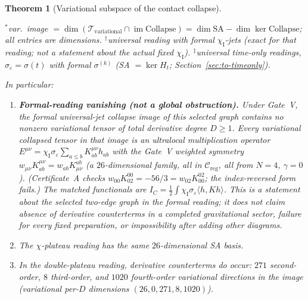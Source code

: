 \documentclass{article}
\newtheorem{theorem}[proposition]{Theorem}
\theoremstyle{remark}
\newcommand{\sigeps}{\sigma_\varepsilon}
\newcommand{\chiI}{\chi_{\mathrm I}}
\newcommand{\Creg}{\mathcal C_{\mathrm{reg}}}
\newcommand{\Coll}{\mathrm{Collapse}}
\begin{document}
\begin{theorem}[Variational subspace of the contact collapse]
\begin{center}
$^\ast$var.\ image $=\dim(\mathcal T_{\mathrm{variational}}\cap\operatorname{im}\Coll)=\dim\mathrm{SA}-\dim\ker\Coll$; all entries are dimensions.
$^\dagger$universal reading with formal $\chiI$-jets (exact for that reading; not a statement about the actual fixed $\chiI$).
$^\ddagger$universal time-only readings, $\sigeps=\sigma(t)$ with formal $\sigma^{(k)}$ (SA $=\ker H_t$; Section~\ref{sec:to-timeonly}).
\end{center}
In particular:
\begin{enumerate}
\item[(i)] \textbf{Formal-reading vanishing (not a global obstruction).} Under Gate~V, the formal universal-jet collapse image of this selected graph contains no nonzero variational tensor of total derivative degree $D\ge1$.
Every variational collapsed tensor in that image is an ultralocal multiplication operator $E^{\mu\nu}=\chiI\sigeps\sum_{a\le b}K^{\mu\nu}_{ab}h_{ab}$ with the Gate~V weighted symmetry
$w_{\mu\nu}K^{\mu\nu}_{ab}=w_{ab}K^{ab}_{\mu\nu}$
(a $26$-dimensional family, all in $\Creg$, all from $N=4$, $\gamma=0$).
(Certificate~A checks $w_{00}K^{00}_{02}=-56/3=w_{02}K^{02}_{00}$; the index-reversed form fails.)
The matched functionals are $I_C=\tfrac12\int\chiI\sigeps\langle h,Kh\rangle$.
This is a statement about the selected two-edge graph in the formal reading; it does not claim absence of derivative counterterms in a completed gravitational sector, failure for every fixed preparation, or impossibility after adding other diagrams.
\item[(ii)] The $\chi$-plateau reading has the same $26$-dimensional SA basis.
\item[(iii)] In the double-plateau reading, derivative counterterms do occur: $271$ second-order, $8$ third-order, and $1020$ fourth-order variational directions in the image (variational per-$D$ dimensions $(26,0,271,8,1020)$).
\end{enumerate}
\end{theorem}
\end{document}
